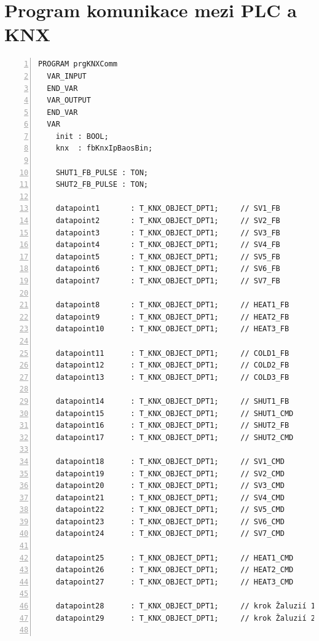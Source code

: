 \chapter{Program komunikace mezi PLC a KNX}
\label{apend:KNXComm}
\begin{lstlisting}[language=ST, breaklines=true, numbers=left, numberstyle=\small, numbersep=10pt, frame=single, basicstyle=\ttfamily\small, caption={Program komunikace mezi PLC a KNX}, label={lst:prgKNXComm}]
  PROGRAM prgKNXComm
  VAR_INPUT
  END_VAR
  VAR_OUTPUT
  END_VAR
  VAR
    init : BOOL;
    knx  : fbKnxIpBaosBin;
    
    SHUT1_FB_PULSE : TON;
    SHUT2_FB_PULSE : TON;

    datapoint1       : T_KNX_OBJECT_DPT1;     // SV1_FB
    datapoint2       : T_KNX_OBJECT_DPT1;     // SV2_FB
    datapoint3       : T_KNX_OBJECT_DPT1;     // SV3_FB
    datapoint4       : T_KNX_OBJECT_DPT1;     // SV4_FB
    datapoint5       : T_KNX_OBJECT_DPT1;     // SV5_FB
    datapoint6       : T_KNX_OBJECT_DPT1;     // SV6_FB
    datapoint7       : T_KNX_OBJECT_DPT1;     // SV7_FB

    datapoint8       : T_KNX_OBJECT_DPT1;     // HEAT1_FB
    datapoint9       : T_KNX_OBJECT_DPT1;     // HEAT2_FB
    datapoint10      : T_KNX_OBJECT_DPT1;     // HEAT3_FB

    datapoint11      : T_KNX_OBJECT_DPT1;     // COLD1_FB
    datapoint12      : T_KNX_OBJECT_DPT1;     // COLD2_FB
    datapoint13      : T_KNX_OBJECT_DPT1;     // COLD3_FB

    datapoint14      : T_KNX_OBJECT_DPT1;     // SHUT1_FB
    datapoint15      : T_KNX_OBJECT_DPT1;     // SHUT1_CMD
    datapoint16      : T_KNX_OBJECT_DPT1;     // SHUT2_FB
    datapoint17      : T_KNX_OBJECT_DPT1;     // SHUT2_CMD

    datapoint18      : T_KNX_OBJECT_DPT1;     // SV1_CMD
    datapoint19      : T_KNX_OBJECT_DPT1;     // SV2_CMD
    datapoint20      : T_KNX_OBJECT_DPT1;     // SV3_CMD
    datapoint21      : T_KNX_OBJECT_DPT1;     // SV4_CMD
    datapoint22      : T_KNX_OBJECT_DPT1;     // SV5_CMD
    datapoint23      : T_KNX_OBJECT_DPT1;     // SV6_CMD
    datapoint24      : T_KNX_OBJECT_DPT1;     // SV7_CMD

    datapoint25      : T_KNX_OBJECT_DPT1;     // HEAT1_CMD
    datapoint26      : T_KNX_OBJECT_DPT1;     // HEAT2_CMD
    datapoint27      : T_KNX_OBJECT_DPT1;     // HEAT3_CMD

    datapoint28      : T_KNX_OBJECT_DPT1;     // krok Žaluzií 1
    datapoint29      : T_KNX_OBJECT_DPT1;     // krok Žaluzií 2


\end{lstlisting}
